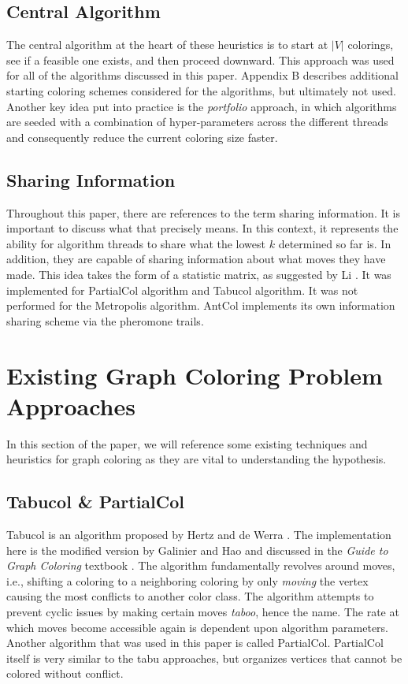 \documentclass[runningheads]{llncs}
\begin{document}
\subsection{Central Algorithm}

The central algorithm at the heart of these heuristics is to start at $|V|$ colorings, see if a feasible one exists, and then proceed downward.
This approach was used for all of the algorithms discussed in this paper. Appendix B describes additional starting coloring schemes considered for the algorithms, but ultimately not used. Another key idea put into practice is the \emph{portfolio} approach, in which algorithms are seeded with a combination of hyper-parameters across the different threads and consequently reduce the current coloring size faster.

\subsection{Sharing Information}
Throughout this paper, there are references to the term sharing information. It is important to discuss what that precisely means. In this context, it represents the ability for algorithm threads to share what the lowest $k$ determined so far is. In addition, they are capable of sharing information about what moves they have made. This idea takes the form of a statistic matrix, as suggested by Li \cite{https://doi.org/10.5445/ir/1000083192}. It was implemented for PartialCol algorithm and Tabucol algorithm. It was not performed for the Metropolis algorithm. AntCol implements its own information sharing scheme via the pheromone trails.

\section{Existing Graph Coloring Problem Approaches }

In this section of the paper, we will reference some existing techniques and heuristics for graph coloring as they are vital to understanding the hypothesis.

\subsection{Tabucol \& PartialCol}\label{AA}
Tabucol is an algorithm proposed by Hertz and de Werra \cite{hdw}. The implementation here is the modified version by Galinier and Hao \cite{TabuCol} and discussed in the \emph{Guide to Graph Coloring} textbook \cite{10.5555/2851123}. The algorithm fundamentally revolves around moves, i.e., shifting a coloring to a neighboring coloring by only \emph{moving} the vertex causing the most conflicts to another color class. The algorithm attempts to prevent cyclic issues by making certain moves \emph{taboo}, hence the name. The rate at which moves become accessible again is dependent upon algorithm parameters. Another algorithm that was used in this paper is called PartialCol. PartialCol itself is very similar to the tabu approaches, but organizes vertices that cannot be colored without conflict.
\end{document}

